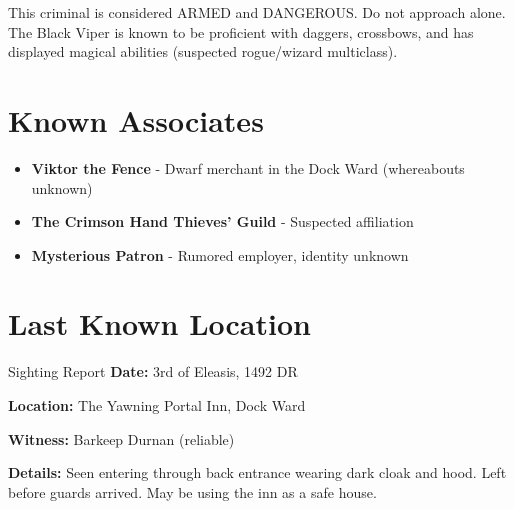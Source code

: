 \documentclass[letterpaper]{dndbook}
\begin{document}
\begin{DndReadAloud}
    This criminal is considered ARMED and DANGEROUS. Do not approach alone. The Black Viper is known to be proficient with daggers, crossbows, and has displayed magical abilities (suspected rogue/wizard multiclass).
\end{DndReadAloud}

\section*{Known Associates}

\begin{itemize}
    \item \textbf{Viktor the Fence} - Dwarf merchant in the Dock Ward (whereabouts unknown)
    \item \textbf{The Crimson Hand Thieves' Guild} - Suspected affiliation
    \item \textbf{Mysterious Patron} - Rumored employer, identity unknown
\end{itemize}

\section*{Last Known Location}

\begin{DndSidebar}{Sighting Report}
    \textbf{Date:} 3rd of Eleasis, 1492 DR

    \textbf{Location:} The Yawning Portal Inn, Dock Ward

    \textbf{Witness:} Barkeep Durnan (reliable)

    \textbf{Details:} Seen entering through back entrance wearing dark cloak and hood. Left before guards arrived. May be using the inn as a safe house.
\end{DndSidebar}

\vspace{1cm}
\end{document}
